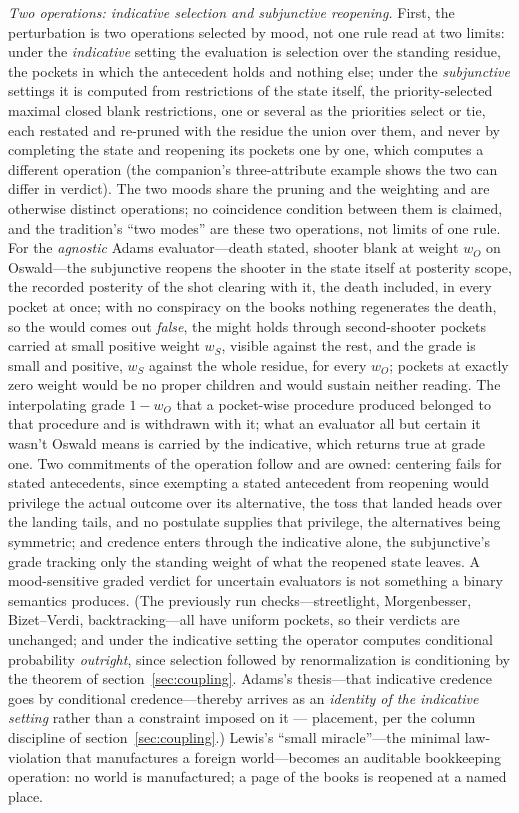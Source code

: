 \documentclass[11pt]{article}
\theoremstyle{definition}
\begin{document}
\textit{Two operations: indicative selection and subjunctive reopening.} First, the perturbation is two operations selected by mood, not one rule read at two limits: under the \emph{indicative} setting the evaluation is selection over the standing residue, the pockets in which the antecedent holds and nothing else; under the \emph{subjunctive} settings it is computed from restrictions of the state itself, the priority-selected maximal closed blank restrictions, one or several as the priorities select or tie, each restated and re-pruned with the residue the union over them, and never by completing the state and reopening its pockets one by one, which computes a different operation (the companion's three-attribute example shows the two can differ in verdict). The two moods share the pruning and the weighting and are otherwise distinct operations; no coincidence condition between them is claimed, and the tradition's ``two modes'' are these two operations, not limits of one rule. For the \emph{agnostic} Adams evaluator---death stated, shooter blank at weight $w_O$ on Oswald---the subjunctive reopens the shooter in the state itself at posterity scope, the recorded posterity of the shot clearing with it, the death included, in every pocket at once; with no conspiracy on the books nothing regenerates the death, so the would comes out \emph{false}, the might holds through second-shooter pockets carried at small positive weight $w_S$, visible against the rest, and the grade is small and positive, $w_S$ against the whole residue, for every $w_O$; pockets at exactly zero weight would be no proper children and would sustain neither reading. The interpolating grade $1 - w_O$ that a pocket-wise procedure produced belonged to that procedure and is withdrawn with it; what an evaluator all but certain it wasn't Oswald means is carried by the indicative, which returns true at grade one. Two commitments of the operation follow and are owned: centering fails for stated antecedents, since exempting a stated antecedent from reopening would privilege the actual outcome over its alternative, the toss that landed heads over the landing tails, and no postulate supplies that privilege, the alternatives being symmetric; and credence enters through the indicative alone, the subjunctive's grade tracking only the standing weight of what the reopened state leaves. A mood-sensitive graded verdict for uncertain evaluators is not something a binary semantics produces. (The previously run checks---streetlight, Morgenbesser, Bizet--Verdi, backtracking---all have uniform pockets, so their verdicts are unchanged; and under the indicative setting the operator computes conditional probability \emph{outright}, since selection followed by renormalization is conditioning by the theorem of section~\ref{sec:coupling}. Adams's thesis---that indicative credence goes by conditional credence---thereby arrives as an \emph{identity of the indicative setting} rather than a constraint imposed on it \cite{adams1975logic} --- placement, per the column discipline of section~\ref{sec:coupling}.) Lewis's ``small miracle''---the minimal law-violation that manufactures a foreign world---becomes an auditable bookkeeping operation: no world is manufactured; a page of the books is reopened at a named place.
\end{document}
